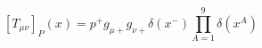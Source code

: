 \begin{equation}
\left[T_{\mu\nu}\right]_P(x)
=p^+g_{\mu+}g_{\nu+}\delta(x^-)\prod_{A=1}^9\delta(x^A)
\end{equation}

